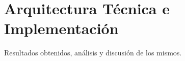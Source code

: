 \chapter{Arquitectura Técnica e Implementación}

Resultados obtenidos, análisis y discusión de los mismos.
